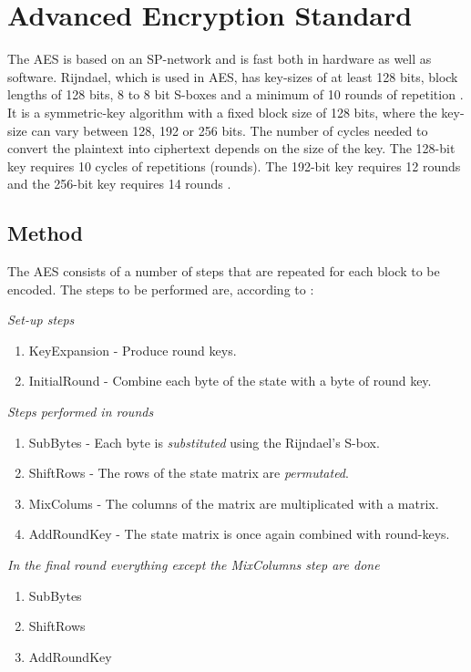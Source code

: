 \chapter{Advanced Encryption Standard}\label{ch:AES}
The AES is based on an SP-network and is fast both in hardware as well 
as software. Rijndael, which is used in AES, has key-sizes of at least 
128 bits, block lengths of 128 bits, 8 to 8 bit S-boxes and a minimum 
of 10 rounds of repetition \citep[p. 79]{Stinson:2006}. It is a 
symmetric-key algorithm with a fixed block size of 128 bits, where the 
key-size can vary between 128, 192 or 256 bits. The number of cycles 
needed to convert the plaintext into ciphertext depends on the size of 
the key. The 128-bit key requires 10 cycles of repetitions (rounds). 
The 192-bit key requires 12 rounds and the 256-bit key requires 14 
rounds \citep[p. 103]{Stinson:2006}.

\section{Method}
The AES consists of a number of steps that are repeated for each block 
to be encoded. The steps to be performed are, according to 
\citet{Stinson:2006}:

\emph{Set-up steps}
\begin{enumerate}
\item KeyExpansion - Produce round keys.
\item InitialRound - Combine each byte of the state with a byte of 
  round key.
\end{enumerate}
\emph{Steps performed in rounds}
\begin{enumerate}
\item SubBytes - Each byte is \emph{substituted} using the Rijndael's 
  S-box.
\item ShiftRows - The rows of the state matrix are \emph{permutated}.
\item MixColums - The columns of the matrix are multiplicated with a 
  matrix.
\item AddRoundKey - The state matrix is once again combined with 
  round-keys.
\end{enumerate}
\emph{In the final round everything except the MixColumns step are done}
\begin{enumerate}
\item SubBytes
\item ShiftRows
\item AddRoundKey
\end{enumerate}

